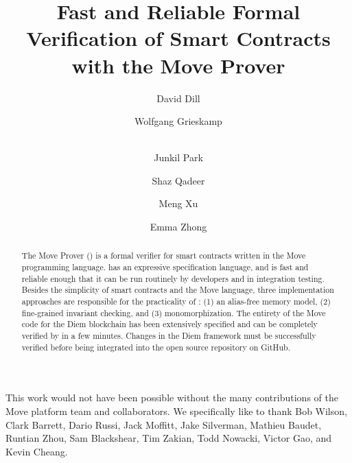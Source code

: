 \documentclass[runningheads]{llncs}
\begin{document}
\author{
  David Dill \and Wolfgang Grieskamp \and \\ Junkil
  Park \and Shaz Qadeer \and Meng Xu \and Emma Zhong
}


\title{Fast and Reliable Formal Verification of Smart Contracts with the Move Prover}

\maketitle
\begin{abstract}
  The Move Prover (\MVP) is a formal verifier for smart contracts written in the
  Move programming language. \MVP has an expressive specification language, and
  is fast and reliable enough that it can be run routinely by developers and in
  integration testing.  Besides the simplicity of smart contracts and the Move
  language, three implementation approaches are responsible for the practicality
  of \MVP: (1) an alias-free memory model, (2) fine-grained invariant checking,
  and (3) monomorphization.  The entirety of the Move code for the Diem
  blockchain has been extensively specified and can be completely verified by
  \MVP in a few minutes. Changes in the Diem framework must be successfully
  verified before being integrated into the open source repository on GitHub.
\end{abstract}









This work would not have been possible without the many contributions of the
Move platform team and collaborators.  We specifically like to thank Bob Wilson,
Clark Barrett, Dario Russi, Jack Moffitt, Jake Silverman, Mathieu Baudet,
Runtian Zhou, Sam Blackshear, Tim Zakian, Todd Nowacki, Victor Gao, and Kevin
Cheang.

\newpage



\appendix
\newpage

\newpage

\end{document}
